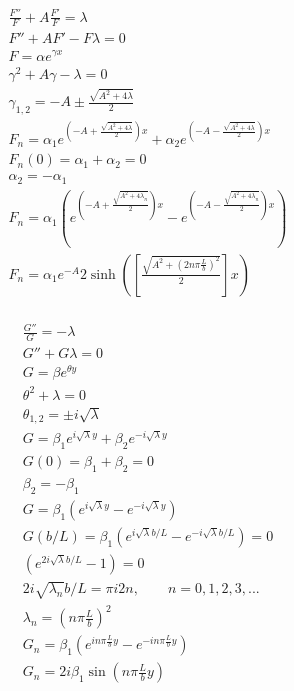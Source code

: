 \documentclass[11pt]{article}
\begin{document}
\noindent\begin{minipage}[b]{.5\linewidth}\centering
\begin{equation}\begin{aligned}
\frac{F''}{F} + A \frac{F'}{F} = \lambda \\
F'' + A F' - F \lambda = 0 \\
F = \alpha e^{\gamma x} \\
\gamma^2 + A \gamma - \lambda = 0 \\
\gamma_{1,2} = -A \pm \frac{\sqrt{A^2 + 4\lambda}}{2} \\
F_n = \alpha_1 e^{\left(-A + \frac{\sqrt{A^2 + 4\lambda}}{2}\right) x} + \alpha_2 e^{\left(-A - \frac{\sqrt{A^2 + 4\lambda}}{2} \right) x} \\
F_n(0) = \alpha_1 + \alpha_2  = 0 \\
\alpha_2 = - \alpha_1 \\
F_n = \alpha_1 \left( e^{\left(-A + \frac{\sqrt{A^2 + 4\lambda_n}}{2}\right) x} - e^{\left(-A - \frac{\sqrt{A^2 + 4\lambda_n}}{2} \right) x} \right) \\
F_n = \alpha_1 e^{-A} 2 \sinh \left( \left[\frac{\sqrt{A^2 + \left(2 n \pi \frac{L}{b} \right)^2}}{2}\right] x \right) \\
\end{aligned} \end{equation}
\end{minipage}
\noindent\begin{minipage}[b]{.5\linewidth}\centering
\begin{equation}\begin{aligned}
\frac{G''}{G} = - \lambda \\
G'' + G \lambda = 0 \\
G = \beta e^{\theta y} \\
\theta^2 + \lambda = 0 \\
\theta_{1,2} = \pm i \sqrt{\lambda} \\
G = \beta_1 e^{i \sqrt{\lambda} y} + \beta_2 e^{-i \sqrt{\lambda} y} \\
G(0) = \beta_1 + \beta_2 = 0 \\
\beta_2 = - \beta_1 \\
G = \beta_1 \left( e^{i \sqrt{\lambda} y} - e^{-i \sqrt{\lambda} y} \right) \\
G(b/L) = \beta_1 \left( e^{i \sqrt{\lambda} b/L} - e^{-i \sqrt{\lambda} b/L} \right) = 0 \\
                 \left( e^{2 i \sqrt{\lambda} b/L} - 1 \right) = 0 \\
2 i \sqrt{\lambda_n} b/L = \pi i 2n, \qquad n = 0,1,2,3,... \\
\lambda_n = \left( n \pi \frac{L}{b} \right)^2 \\
G_n = \beta_1 \left( e^{i n \pi \frac{L}{b} y} - e^{-i n \pi \frac{L}{b} y} \right) \\
G_n = 2i \beta_1 \sin \left(n \pi \frac{L}{b} y \right) \\
\end{aligned} \end{equation}
\end{minipage}
\end{document}
